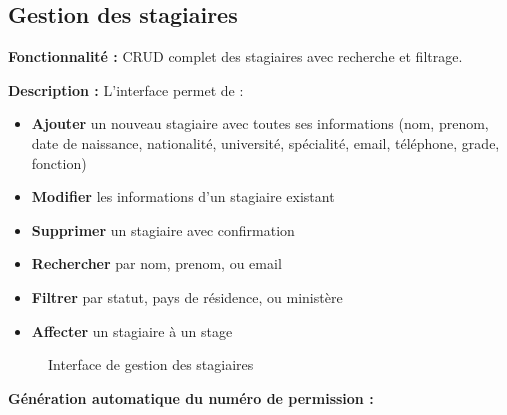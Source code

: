 \documentclass[12pt,a4paper]{report}
\begin{document}
\subsection{Gestion des stagiaires}

\textbf{Fonctionnalité :} CRUD complet des stagiaires avec recherche et filtrage.

\textbf{Description :} L'interface permet de :

\begin{itemize}[leftmargin=1cm]
    \item \textbf{Ajouter} un nouveau stagiaire avec toutes ses informations (nom, prenom, date de naissance, nationalité, université, spécialité, email, téléphone, grade, fonction)
    \item \textbf{Modifier} les informations d'un stagiaire existant
    \item \textbf{Supprimer} un stagiaire avec confirmation
    \item \textbf{Rechercher} par nom, prenom, ou email
    \item \textbf{Filtrer} par statut, pays de résidence, ou ministère
    \item \textbf{Affecter} un stagiaire à un stage
\end{itemize}

\begin{figure}[H]
\centering
{}
\caption{Interface de gestion des stagiaires}
\end{figure}

\textbf{Génération automatique du numéro de permission :}
\end{document}
